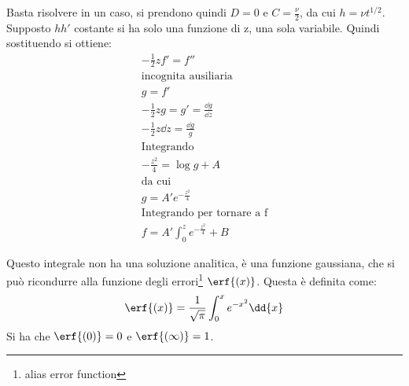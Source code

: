 %
Basta risolvere in un caso, si prendono quindi $D = 0$ e $C = \frac{\nu}{2}$, da cui $h = \nu t^{1/2}$.
Supposto $h h'$ costante si ha solo una funzione di z, una sola variabile.
Quindi sostituendo si ottiene:
	\begin{equation*}
		\begin{gathered}
			- \frac{1}{2} z f' = f''\\
			\text{incognita ausiliaria}\\
			g = f'\\
			- \frac{1}{2} z g = g' = \frac{\dd{g}}{\dd{z}}\\
			- \frac{1}{2} z \dd{z} = \frac{\dd{g}}{g}\\
			\text{Integrando}\\
			- \frac{z^2}{4} = \log{g} + A\\
			\text{da cui}\\
			g = A' e^{- \frac{z^2}{4}}\\
			\text{Integrando per tornare a f}\\
			f = A' \int_0^z e^{- \frac{z^2}{4}} + B
		\end{gathered}
	\end{equation*}
%

Questo integrale non ha una soluzione analitica, è una funzione gaussiana, che si può ricondurre alla funzione degli errori\footnote{alias error function} $\erf{(x)}$.
Questa è definita come:
%
	\begin{equation*}
		\erf{(x)} = \frac{1}{\sqrt{\pi}} \int_0^x e^{-x^2} \dd{x}
	\end{equation*}
%
Si ha che $\erf{(0)} = 0$ e $\erf{(\infty)} = 1$.

